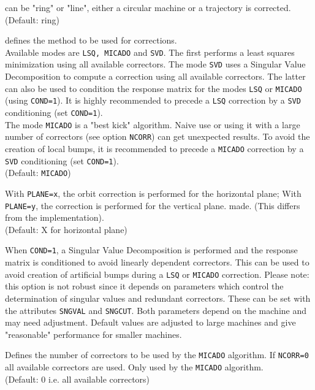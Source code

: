 \begin{madlist}
    can be "ring" or "line", either a circular machine
     or a trajectory is corrected.   
     \\ (Default: ring) 

    defines the method to be used for corrections. 
     \\ Available modes are \texttt{LSQ, MICADO} and \texttt{SVD}.  
     The first performs a
     least squares minimization using all available correctors. The mode
     \texttt{SVD} uses a Singular Value Decomposition to compute a correction
     using all available correctors. The latter can also be used to
     condition the response matrix for the modes \texttt{LSQ} or \texttt{MICADO} (using
     \texttt{COND=1}). It is highly recommended to precede a \texttt{LSQ} correction by a
     \texttt{SVD} conditioning (set \texttt{COND=1}).  
     \\ The mode \texttt{MICADO} is a "best kick" algorithm. Naive use or using
     it with a large number of correctors (see option \texttt{NCORR}) can get
     unexpected results. To avoid the creation of local bumps, it is
     recommended to precede a \texttt{MICADO} correction by a \texttt{SVD} conditioning
     (set \texttt{COND=1}).  
     \\ (Default: \texttt{MICADO})

    With \texttt{PLANE=x}, the orbit correction
     is performed for the horizontal plane; With \texttt{PLANE=y}, 
     the correction is performed for the vertical plane. made. (This
     differs from the \madeight implementation).  
     \\ (Default: X for horizontal plane) 

    When \texttt{COND=1}, a Singular Value Decomposition is
     performed and  the response matrix is conditioned to avoid linearly
     dependent correctors. This can be used to avoid creation of
     artificial bumps during a \texttt{LSQ} or \texttt{MICADO} correction.  
     Please note: this option is not robust since it
     depends on parameters which control the determination of singular
     values and redundant correctors. These can be set with the attributes
     \texttt{SNGVAL} and \texttt{SNGCUT}. Both parameters depend on the machine and may
     need adjustment. Default values are adjusted to large machines and give
     "reasonable" performance for smaller machines.

    Defines the number of correctors to be used by the 
     \texttt{MICADO} algorithm. If \texttt{NCORR=0} all available
     correctors are used. Only used by the \texttt{MICADO} algorithm.
     \\ (Default: 0 i.e. all available correctors)


\end{madlist}
